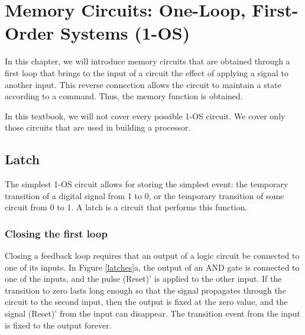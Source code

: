 \chapter{Memory Circuits: One-Loop, First-Order Systems (1-OS)}
\localtoc

In this chapter, we will introduce memory circuits that are obtained through a first loop that brings to the input of a circuit the effect of applying a signal to another input. This reverse connection allows the circuit to maintain a state according to a command. Thus, the memory function is obtained.

In this textbook, we will not cover every possible 1-OS circuit. We cover only those circuits that are used in building a processor. 

\section{Latch}

The simplest 1-OS circuit allows for storing the simplest event: the temporary transition of a digital signal from 1 to 0, or the temporary transition of some circuit from 0 to 1. A latch is a circuit that performs this function.

\subsection{Closing the first loop}

Closing a feedback loop requires that an output of a logic circuit be connected to one of its inputs. In Figure \ref{latches}a, the output of an AND gate is connected to one of the inputs, and the pulse (Reset)' is applied to the other input. If the transition to zero lasts long enough so that the signal propagates through the circuit to the second input, then the output is fixed at the zero value, and the signal (Reset)' from the input can disappear. The transition event from the input is fixed to the output forever.



